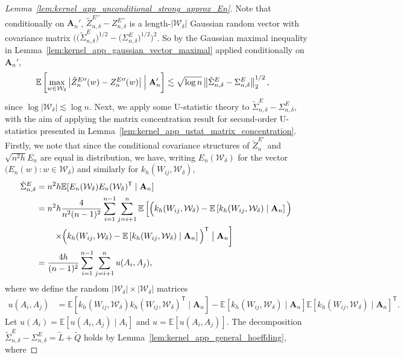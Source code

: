 \documentclass[11pt,lof]{puthesis}
\newcommand{\E}{\ensuremath{\mathbb{E}}}
\newcommand{\bA}{\ensuremath{\mathbf{A}}}
\newcommand{\cW}{\ensuremath{\mathcal{W}}}
\newcommand{\T}{\ensuremath{\mathsf{T}}}
\newcommand{\dprime}{\ensuremath{\prime\prime}}
\theoremstyle{break}
\theoremstyle{proof}
\newtheorem{proof}{Proof}
\begin{document}
\begin{proof}[Lemma~\ref{lem:kernel_app_unconditional_strong_approx_En}]
Note that conditionally on $\bA_n'$,
$\tilde Z_{n,\delta}^{E\dprime} - Z_{n,\delta}^{E\dprime}$
is a length-$|\cW_\delta|$
Gaussian random vector with covariance matrix
$\big(
\big(\tilde \Sigma^E_{n,\delta}\big)^{1/2}
- \big(\Sigma^E_{n,\delta}\big)^{1/2}
\big)^2$.
So by the Gaussian maximal inequality in
Lemma~\ref{lem:kernel_app_gaussian_vector_maximal}
applied conditionally on $\bA_n'$,
%
\begin{align*}
\E\left[
\max_{w \in \cW_\delta}
\big|\tilde Z_n^{E\dprime}(w) - Z_n^{E\dprime}(w)\big|
\Bigm| \bA_n'
\right]
&\lesssim
\sqrt{\log n}
\left\|
\tilde\Sigma^E_{n,\delta}
- \Sigma^E_{n,\delta}
\right\|_2^{1/2},
\end{align*}
%
since $\log |\cW_\delta| \lesssim \log n$.
Next, we apply some U-statistic theory to
$\tilde\Sigma^E_{n,\delta} - \Sigma^E_{n,\delta}$,
with the aim of applying the
matrix concentration result
for second-order U-statistics
presented in Lemma~\ref{lem:kernel_app_ustat_matrix_concentration}.
Firstly, we note that
since
the conditional covariance structures of
$\tilde Z_n^{E\prime}$ and $\sqrt{n^2h} E_n$
are equal in distribution,
we have,
writing $E_n(\cW_\delta)$
for the vector $\big(E_n(w) : w \in \cW_\delta\big)$
and similarly for $k_h(W_{i j}, \cW_\delta)$,
%
\begin{align*}
\tilde\Sigma^E_{n,\delta}
&=
n^2h \E[E_n(\cW_\delta) E_n(\cW_\delta)^\T \mid \bA_n] \\
&=
n^2h
\frac{4}{n^2(n-1)^2}
\sum_{i=1}^{n-1}
\sum_{j=i+1}^{n}
\E\left[
\Big(
k_h(W_{i j}, \cW_\delta)
- \E\left[
k_h(W_{i j}, \cW_\delta)
\mid \bA_n
\right]
\Big)
\right. \\
&\qquad\left.
\times\Big(
k_h(W_{i j}, \cW_\delta)
- \E\left[
k_h(W_{i j}, \cW_\delta)
\mid \bA_n
\right]
\Big)^\T
\bigm\vert \bA_n
\right] \\
&=
\frac{4h}{(n-1)^2}
\sum_{i=1}^{n-1}
\sum_{j=i+1}^{n}
u(A_i, A_j),
\end{align*}
%
where we
define the random
$|\cW_\delta| \times |\cW_\delta|$
matrices
%
\begin{align*}
u(A_i, A_j)
&=
\E\!\left[
k_h(W_{i j}, \cW_\delta)
k_h(W_{i j}, \cW_\delta)^\T
\mid \bA_n
\right]
-
\E\!\left[
k_h(W_{i j}, \cW_\delta)
\mid \bA_n
\right]
\E\!\left[
k_h(W_{i j}, \cW_\delta)
\mid \bA_n
\right]^\T.
\end{align*}
%
Let $u(A_i) = \E[u(A_i, A_j) \mid A_i]$ and
$u = \E[u(A_i, A_j)]$.
The decomposition
$\tilde \Sigma^E_{n,\delta} - \Sigma^E_{n,\delta}
= \tilde L +\tilde Q$
holds by Lemma~\ref{lem:kernel_app_general_hoeffding}, where

\end{proof}
\end{document}
